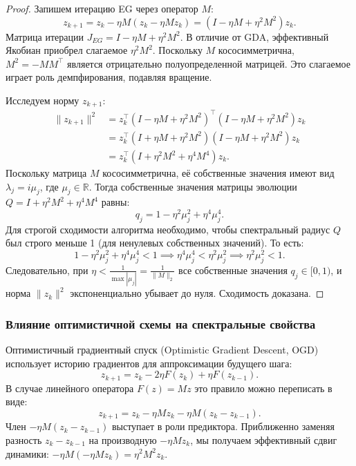 \documentclass[12pt,a4paper]{article}
\begin{document}
	\begin{proof}
		Запишем итерацию EG через оператор $M$:
		\begin{equation}
			z_{k+1} = z_k - \eta M (z_k - \eta M z_k) = (I - \eta M + \eta^2 M^2)z_k.
		\end{equation}
		Матрица итерации $J_{EG} = I - \eta M + \eta^2 M^2$. В отличие от GDA, эффективный Якобиан приобрел слагаемое $\eta^2 M^2$. Поскольку $M$ кососимметрична, $M^2 = -M M^\top$ является отрицательно полуопределенной матрицей. Это слагаемое играет роль  демпфирования, подавляя вращение.
		
		Исследуем норму $z_{k+1}$:
		\begin{align}
			\|z_{k+1}\|^2 &= z_k^\top (I - \eta M + \eta^2 M^2)^\top (I - \eta M + \eta^2 M^2) z_k \nonumber \\
			&= z_k^\top (I + \eta M + \eta^2 M^2)(I - \eta M + \eta^2 M^2) z_k \nonumber \\
			&= z_k^\top (I + \eta^2 M^2 + \eta^4 M^4) z_k.
		\end{align}
		Поскольку матрица $M$ кососимметрична, её собственные значения имеют вид $\lambda_j = i\mu_j$, где $\mu_j \in \mathbb{R}$. Тогда собственные значения матрицы эволюции $Q = I + \eta^2 M^2 + \eta^4 M^4$ равны:
		\begin{equation}
			q_j = 1 - \eta^2 \mu_j^2 + \eta^4 \mu_j^4.
		\end{equation}
		Для строгой сходимости алгоритма необходимо, чтобы спектральный радиус $Q$ был строго меньше 1 (для ненулевых собственных значений). То есть:
		\begin{equation}
			1 - \eta^2 \mu_j^2 + \eta^4 \mu_j^4 < 1 \implies \eta^4 \mu_j^4 < \eta^2 \mu_j^2 \implies \eta^2 \mu_j^2 < 1.
		\end{equation}
		Следовательно, при $\eta < \frac{1}{\max |\mu_j|} = \frac{1}{\|M\|_2}$ все собственные значения $q_j \in [0, 1)$, и норма $\|z_k\|^2$ экспоненциально убывает до нуля. Сходимость доказана.
	\end{proof}
	
	\subsubsection{Влияние оптимистичной схемы на спектральные свойства}
	Оптимистичный градиентный спуск (Optimistic Gradient Descent, OGD) использует историю градиентов для аппроксимации будущего шага:
	\begin{equation}
		z_{k+1} = z_k - 2\eta F(z_k) + \eta F(z_{k-1}).
	\end{equation}
	В случае линейного оператора $F(z) = Mz$ это правило можно переписать в виде:
	\begin{equation}
		z_{k+1} = z_k - \eta M z_k - \eta M (z_k - z_{k-1}).
	\end{equation}
	Член $-\eta M (z_k - z_{k-1})$ выступает в роли предиктора. Приближенно заменяя разность $z_k - z_{k-1}$ на производную $-\eta M z_k$, мы получаем эффективный сдвиг динамики: $-\eta M (-\eta M z_k) = \eta^2 M^2 z_k$. 
	
\end{document}
